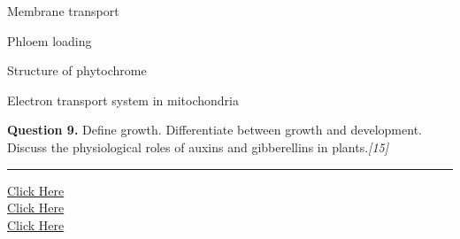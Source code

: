 \documentclass[11pt,a4paper]{article}
\newcommand{\pts}[1]{\hfill   \textit{[#1]}}
\begin{document}
\begin{parts}
  \item Membrane transport
  \item Phloem loading
  \item Structure of phytochrome
  \item Electron transport system in mitochondria
\end{parts}

\medskip


\noindent   \textbf{Question 9.} Define growth. Differentiate between growth and development. Discuss the physiological roles of auxins and gibberellins in plants.\pts{15}

\vfill
\rule{\linewidth}{0.4pt}

\begin{center}\small
\href{https://bhu-exam.vercel.app/}{Click Here}\\[4pt]\href{https://me-aryan.vercel.app/}{Click Here}\\[4pt]\href{https://quashan-me.vercel.app/}{Click Here}
\end{center}
\end{document}
